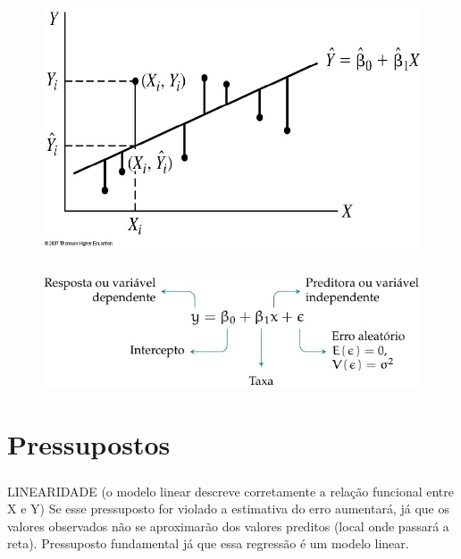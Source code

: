 \documentclass[14pt,aspectratio=1610]{beamer}
\begin{document}
\begin{frame}{}
\frametitle{ }
\begin{block}{}
\justifying
\begin{figure}[H]
    \centering
    \includegraphics[scale=0.5]{Figuras/Regressao}
\end{figure}
\end{block}
\end{frame}

\begin{frame}{}
\frametitle{ }
\begin{block}{}
\justifying
\begin{figure}[H]
    \centering
    \includegraphics[scale=0.5]{Figuras/Regressao3}
\end{figure}
\end{block}
\end{frame}

\section{Pressupostos}
\begin{frame}{}
\frametitle{ }
\begin{block}{LINEARIDADE}
\justifying
(o modelo linear descreve corretamente a relação funcional entre X e Y)
Se esse pressuposto for violado a estimativa do erro aumentará, já que os valores observados não se aproximarão dos valores preditos (local onde passará a reta). Pressuposto fundamental já que essa regressão é um modelo linear.
\end{block}
\end{frame}
\end{document}
